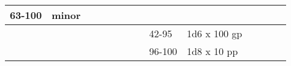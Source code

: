 \begin{longtable}{llllllllllllll}
{\begin{minipage}[t]{0.626in}
63-100\end{minipage}} & \multicolumn{1}{p{0.469in}|}{\begin{minipage}[t]{0.469in}\centering
1 minor\end{minipage}}\\
\hline
\multicolumn{8}{p{1.150in}|}{\begin{minipage}[t]{1.150in}\centering
\end{minipage}} & \multicolumn{1}{|p{0.393in}|}{\begin{minipage}[t]{0.393in}\raggedright
42-95\end{minipage}} & \multicolumn{1}{p{0.469in}|}{\begin{minipage}[t]{0.469in}\raggedright
1d6 x 100 gp\end{minipage}} & \multicolumn{1}{p{0.923in}|}{\begin{minipage}[t]{0.923in}\raggedright
\end{minipage}} & \multicolumn{1}{p{0.469in}|}{\begin{minipage}[t]{0.469in}\raggedright
\end{minipage}} & \multicolumn{1}{p{0.626in}|}{\begin{minipage}[t]{0.626in}\raggedright
\end{minipage}} & \multicolumn{1}{p{0.469in}|}{\begin{minipage}[t]{0.469in}\centering
\end{minipage}}\\
\hline
\multicolumn{8}{p{1.150in}|}{\begin{minipage}[t]{1.150in}\centering
\end{minipage}} & \multicolumn{1}{|p{0.393in}|}{\begin{minipage}[t]{0.393in}\raggedright
96-100\end{minipage}} & \multicolumn{1}{p{0.469in}|}{\begin{minipage}[t]{0.469in}\raggedright
1d8 x 10 pp\end{minipage}} & \multicolumn{1}{p{0.923in}|}{\begin{minipage}[t]{0.923in}\raggedright
\end{minipage}} & \multicolumn{1}{p{0.469in}|}{\begin{minipage}[t]{0.469in}\raggedright
\end{minipage}} & \multicolumn{1}{p{0.626in}|}{\begin{minipage}[t]{0.626in}\raggedright
\end{minipage}} & \multicolumn{1}{p{0.469in}|}{\begin{minipage}[t]{0.469in}\centering

\end{minipage}}
\end{longtable}
